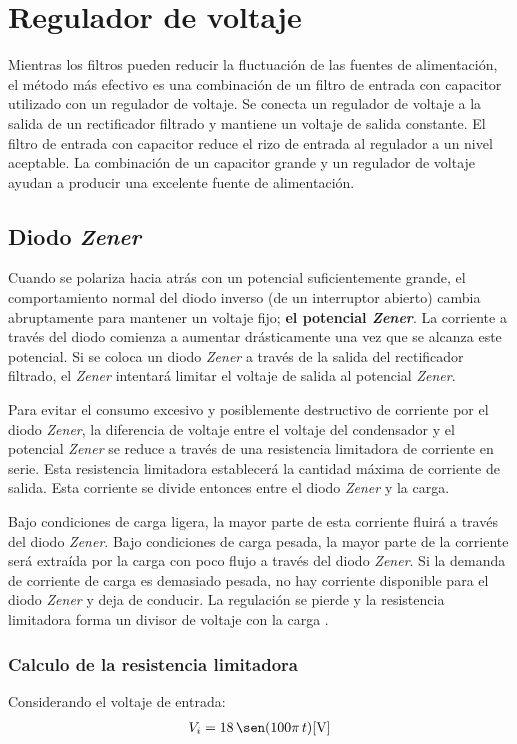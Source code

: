 \section{Regulador de voltaje}
Mientras los filtros pueden reducir la fluctuación de las fuentes de
alimentación, el método más efectivo es una combinación de un filtro de entrada
con capacitor utilizado con un regulador de voltaje. Se conecta un regulador de
voltaje a la salida de un rectificador filtrado y mantiene un voltaje de salida
constante. El filtro de entrada con capacitor reduce el rizo de entrada al
regulador a un nivel aceptable. La combinación de un capacitor grande y un
regulador de voltaje ayudan a producir una excelente fuente de alimentación.

\subsection{Diodo \emph{Zener}}
Cuando se polariza hacia atrás con un potencial suficientemente grande, el
comportamiento normal del diodo inverso (de un interruptor abierto) cambia
abruptamente para mantener un voltaje fijo; \textbf{el potencial \emph{Zener}}.
La corriente a través del diodo comienza a aumentar drásticamente una vez que se
alcanza este potencial. Si se coloca un diodo \emph{Zener} a través de la salida
del rectificador filtrado, el \emph{Zener} intentará limitar el voltaje
de salida al potencial \emph{Zener}.

Para evitar el consumo excesivo y posiblemente destructivo de corriente por el
diodo \emph{Zener}, la diferencia de voltaje entre el voltaje del condensador y
el potencial \emph{Zener} se reduce a través de una resistencia limitadora de
corriente en serie. Esta resistencia limitadora establecerá la cantidad máxima
de corriente de salida. Esta corriente se divide entonces entre el diodo
\emph{Zener} y la carga.

Bajo condiciones de carga ligera, la mayor parte de esta corriente fluirá a
través del diodo \emph{Zener}. Bajo condiciones de carga pesada, la mayor parte
de la corriente será extraída por la carga con poco flujo a través del diodo
\emph{Zener}. Si la demanda de corriente de carga es demasiado pesada, no hay
corriente disponible para el diodo \emph{Zener} y deja de conducir. La
regulación se pierde y la resistencia limitadora forma un divisor de voltaje con
la carga \cite{Fiore}.

\subsubsection{Calculo de la resistencia limitadora}
Considerando el voltaje de entrada:
\begin{equation*}
    \begin{split}
        V_i &= 18\,\sen(100\pi\,t)[\text{V}]\\
    \end{split}
\end{equation*}

